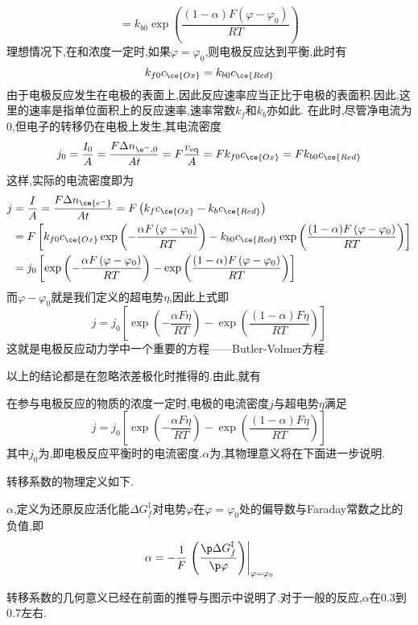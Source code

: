 \documentclass{ctexart}
\begin{document}
\begin{derivation}
\[    =k_{b0}\exp\left(\dfrac{(1-\alpha)F\left(\varphi-\varphi_0\right)}{RT}\right)\]
    理想情况下,在和浓度一定时,如果$\varphi=\varphi_0$,则电极反应达到平衡,此时有
    \[k_{f0}c_{\ce{Ox}}=k_{b0}c_{\ce{Red}}\]
    由于电极反应发生在电极的表面上,因此反应速率应当正比于电极的表面积.因此,这里的速率是指单位面积上的反应速率,速率常数$k_f$和$k_b$亦如此.%
    在此时,尽管净电流为$0$,但电子的转移仍在电极上发生,其电流密度
    \[j_0=\dfrac{I_0}{A}=\dfrac{F\Delta n_{\e^-,0}}{At}=F\dfrac{v_{\text{eq}}}{A}=Fk_{f0}c_{\ce{Ox}}=Fk_{b0}c_{\ce{Red}}\]
    这样,实际的电流密度即为
    \[\begin{aligned}
        j
        &= \dfrac{I}{A}=\dfrac{F\Delta n_{\ce{e^-}}}{At}=F\left(k_fc_{\ce{Ox}}-k_bc_{\ce{Red}}\right) \\
        &= F\left[k_{f0}c_{\ce{Ox}}\exp\left(-\dfrac{\alpha F\left(\varphi-\varphi_0\right)}{RT}\right)-k_{b0}c_{\ce{Red}}\exp\left(\dfrac{(1-\alpha)F\left(\varphi-\varphi_0\right)}{RT}\right)\right] \\
        &= j_0\left[\exp\left(-\dfrac{\alpha F\left(\varphi-\varphi_0\right)}{RT}\right)-\exp\left(\dfrac{(1-\alpha)F\left(\varphi-\varphi_0\right)}{RT}\right)\right]
    \end{aligned}\]
    而$\varphi-\varphi_0$就是我们定义的超电势$\eta$,因此上式即
    \[j=j_0\left[\exp\left(-\dfrac{\alpha F\eta}{RT}\right)-\exp\left(\dfrac{(1-\alpha)F\eta}{RT}\right)\right]\]
    这就是电极反应动力学中一个重要的方程——Butler-Volmer方程.
\end{derivation}
以上的结论都是在忽略浓差极化时推得的.由此,就有
\begin{theorem}
    在参与电极反应的物质的浓度一定时,电极的电流密度$j$与超电势$\eta$满足
    \[j=j_0\left[\exp\left(-\dfrac{\alpha F\eta}{RT}\right)-\exp\left(\dfrac{(1-\alpha)F\eta}{RT}\right)\right]\]
    其中$j_0$为,即电极反应平衡时的电流密度.$\alpha$为,其物理意义将在下面进一步说明.
\end{theorem}
转移系数的物理定义如下.
\begin{definition}[6E.2.2 转移系数]
    $\alpha$,定义为还原反应活化能$\Delta G_{f}^\ddagger$对电势$\varphi$在$\varphi=\varphi_0$处的偏导数与Faraday常数之比的负值,即
    \[\alpha=-\dfrac{1}{F}\left.\left(\dfrac{\p\Delta G_{f}^\ddagger}{\p\varphi}\right)\right|_{\varphi=\varphi_0}\]

\end{definition}
转移系数的几何意义已经在前面的推导与图示中说明了.对于一般的反应,$\alpha$在$0.3$到$0.7$左右.\\
\end{document}

